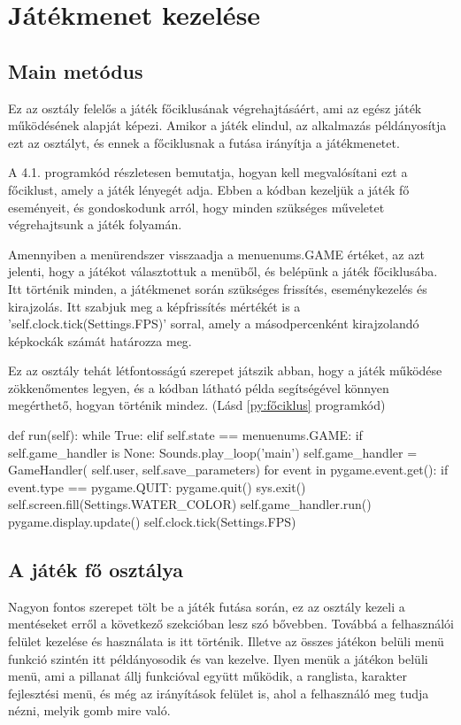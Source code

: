\section{Játékmenet kezelése}

\subsection{Main metódus}
\indent \indent Ez az osztály felelős a játék főciklusának végrehajtásáért, ami az egész játék működésének alapját képezi. Amikor a játék elindul, az alkalmazás példányosítja ezt az osztályt, és ennek a főciklusnak a futása irányítja a játékmenetet.

A 4.1. programkód részletesen bemutatja, hogyan kell megvalósítani ezt a főciklust, amely a játék lényegét adja. Ebben a kódban kezeljük a játék fő eseményeit, és gondoskodunk arról, hogy minden szükséges műveletet végrehajtsunk a játék folyamán.

Amennyiben a menürendszer visszaadja a menuenums.GAME értéket, az azt jelenti, hogy a játékot választottuk a menüből, és belépünk a játék főciklusába. Itt történik minden, a játékmenet során szükséges frissítés, eseménykezelés és kirajzolás. Itt szabjuk meg a képfrissítés mértékét is a 'self.clock.tick(Settings.FPS)' sorral, amely a másodpercenként kirajzolandó képkockák számát határozza meg.

Ez az osztály tehát létfontosságú szerepet játszik abban, hogy a játék működése zökkenőmentes legyen, és a kódban látható példa segítségével könnyen megérthető, hogyan történik mindez. (Lásd \ref{py:főciklus} programkód)


\begin{python}[caption={Játék főciklusa},label=py:főciklus]
    def run(self):
        while True:
            elif self.state == menuenums.GAME:
                if self.game_handler is None:
                    Sounds.play_loop('main')
                    self.game_handler = GameHandler(
                        self.user, self.save_parameters)
                for event in pygame.event.get():
                    if event.type == pygame.QUIT:
                        pygame.quit()
                        sys.exit()
                self.screen.fill(Settings.WATER_COLOR)
                self.game_handler.run()
                pygame.display.update()
                self.clock.tick(Settings.FPS)
\end{python}

\subsection{A játék fő osztálya}
\indent \indent Nagyon fontos szerepet tölt be a játék futása során, ez az osztály kezeli a mentéseket erről a következő szekcióban lesz szó bővebben. 
Továbbá a felhasználói felület kezelése és használata is itt történik. Illetve az összes játékon belüli menü funkció szintén itt példányosodik és van kezelve. Ilyen menük a játékon belüli menü, ami a pillanat állj funkcióval együtt működik, a ranglista, karakter fejlesztési menü, és még az irányítások felület is, ahol a felhasználó meg tudja nézni, melyik gomb mire való.

